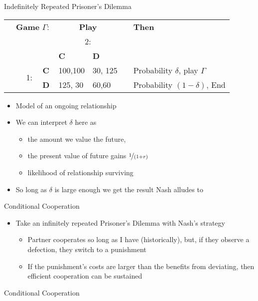 \documentclass{beamer}
\begin{document}
\begin{frame}{Indefinitely Repeated Prisoner's Dilemma}
\begin{center}
\begin{tabular}{ccccp{}|p{}cp{}}
 & \multicolumn{3}{c}{\textbf{Game }$\Gamma:$} & \multicolumn{2}{c}{\textbf{Play}} &  & \textbf{Then}\\
 &  &  &  & \multicolumn{2}{c}{2:} &  & \\
 &  &  &  & \multicolumn{1}{p{0.14\textwidth}}{\textbf{C}} & \textbf{D} &  & \\
\cline{5-6}
 &  & \multirow{2}{*}{1:} & \multicolumn{1}{c|}{\textbf{C}} & 100,100 & \multicolumn{1}{p{0.14\textwidth}|}{30, 125} &  & Probability $\delta$, play $\Gamma$\\
\cline{5-6}
 &  &  & \multicolumn{1}{c|}{\textbf{D}} & 125, 30 & \multicolumn{1}{p{0.14\textwidth}|}{60,60} &  & Probability $(1-\delta)$, End\\
\cline{5-6}
\end{tabular}
\par\end{center}
\begin{itemize}
\item Model of an ongoing relationship
\item We can interpret $\delta$ here as

\begin{itemize}
\item the amount we value the future,
\item the present value of future gains $\nicefrac{1}{(1+r)}$
\item likelihood of relationship surviving \pause
\end{itemize}
\item So long as $\delta$ is large enough we get the result Nash alludes
to
\end{itemize}
\end{frame}\begin{frame}{Conditional Cooperation}
\begin{itemize}
\item Take an infinitely repeated Prisoner's Dilemma with Nash's strategy

\begin{itemize}
\item Partner cooperates so long as I have (historically), but, if they
observe a defection, they switch to a punishment
\item If the punishment's costs are larger than the benefits from deviating,
then efficient cooperation can be sustained
\end{itemize}
\end{itemize}
\end{frame}\begin{frame}{Conditional Cooperation}


\end{frame}
\end{document}
